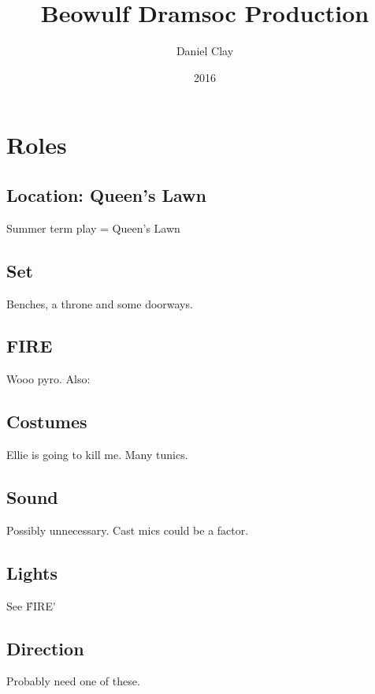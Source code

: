\documentclass[a4paper]{article}
\begin{document}
\title{Beowulf Dramsoc Production}
\date{2016}
\author{
Daniel Clay \\ 
}
\maketitle

\section{Roles}

\subsection{Location: Queen's Lawn}%

Summer term play = Queen's Lawn

\subsection{Set}%

Benches, a throne and some doorways.

\subsection{FIRE}%

Wooo pyro. Also: 

\subsection{Costumes}%

Ellie is going to kill me. Many tunics.

\subsection{Sound}%

Possibly unnecessary. Cast mics could be a factor.

\subsection{Lights}%

See \'FIRE\' 

\subsection{Direction}%

Probably need one of these.
\end{document}

